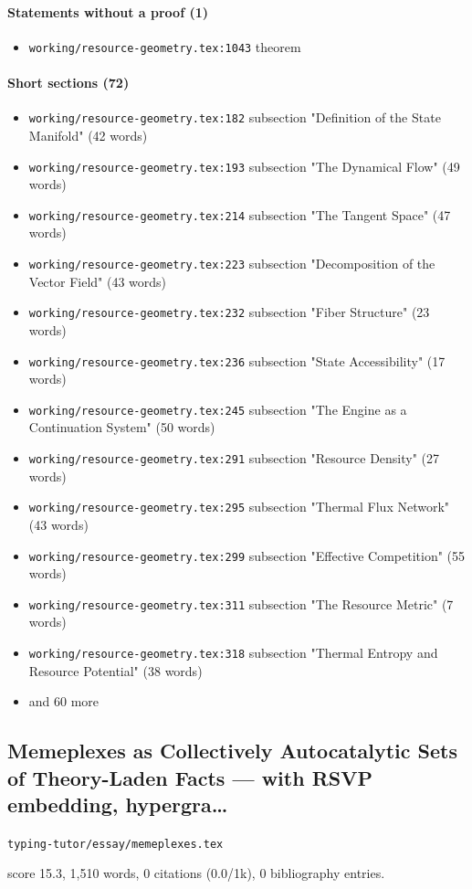 \documentclass[11pt]{article}
\newcommand{\loc}[1]{{\small\color{muted}\texttt{#1}}}
\begin{document}
\paragraph{Statements without a proof (1)}
\begin{itemize}
\item \loc{working/\allowbreak{}resource-geometry.tex:1043} theorem
\end{itemize}
\paragraph{Short sections (72)}
\begin{itemize}
\item \loc{working/\allowbreak{}resource-geometry.tex:182} subsection "Definition of the State Manifold" (42 words)
\item \loc{working/\allowbreak{}resource-geometry.tex:193} subsection "The Dynamical Flow" (49 words)
\item \loc{working/\allowbreak{}resource-geometry.tex:214} subsection "The Tangent Space" (47 words)
\item \loc{working/\allowbreak{}resource-geometry.tex:223} subsection "Decomposition of the Vector Field" (43 words)
\item \loc{working/\allowbreak{}resource-geometry.tex:232} subsection "Fiber Structure" (23 words)
\item \loc{working/\allowbreak{}resource-geometry.tex:236} subsection "State Accessibility" (17 words)
\item \loc{working/\allowbreak{}resource-geometry.tex:245} subsection "The Engine as a Continuation System" (50 words)
\item \loc{working/\allowbreak{}resource-geometry.tex:291} subsection "Resource Density" (27 words)
\item \loc{working/\allowbreak{}resource-geometry.tex:295} subsection "Thermal Flux Network" (43 words)
\item \loc{working/\allowbreak{}resource-geometry.tex:299} subsection "Effective Competition" (55 words)
\item \loc{working/\allowbreak{}resource-geometry.tex:311} subsection "The Resource Metric" (7 words)
\item \loc{working/\allowbreak{}resource-geometry.tex:318} subsection "Thermal Entropy and Resource Potential" (38 words)
\item[] {\color{muted}\small and 60 more}
\end{itemize}
\subsection{Memeplexes as Collectively Autocatalytic Sets of Theory-Laden Facts --- with RSVP embedding, hypergra\ldots{}}
\loc{typing-tutor/\allowbreak{}essay/\allowbreak{}memeplexes.tex}\par
score 15.3, 1,510 words, 0 citations (0.0/1k), 0 bibliography entries.
\end{document}
